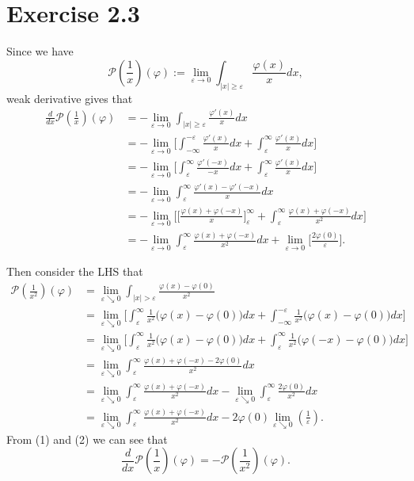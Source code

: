\documentclass[a4paper, 11pt]{article}
\begin{document}
\section{Exercise 2.3}
Since we have
$$
\mathcal{P}(\frac{1}{x})(\varphi):= \lim_{\varepsilon \to 0} \int_{\left|x\right|\geqslant \varepsilon} \frac{\varphi(x)}{x}dx
,
$$ 
weak derivative gives that
\begin{align*}
\frac{d}{dx}\mathcal{P}(\frac{1}{x})(\varphi)
& = - \lim_{\varepsilon \to 0} \int_{\left|x\right|\geqslant \varepsilon}\frac{\varphi' (x)}{x}dx\\
& =- \lim_{\varepsilon \to 0}\Big[\int_{-\infty}^{-\varepsilon}\frac{\varphi'(x)}{x}dx+\int_{\varepsilon}^{\infty}\frac{\varphi'(x)}{x}dx\Big]\\
& = - \lim_{\varepsilon \to 0}\Big[\int^{\infty}_{\varepsilon}\frac{\varphi'(-x)}{-x}dx+\int_{\varepsilon}^{\infty}\frac{\varphi'(x)}{x}dx\Big]\\
& = -\lim_{\varepsilon \to 0} \int_{\varepsilon}^{\infty}\frac{\varphi'(x)-\varphi'(-x)}{x}dx\\
&=-\lim_{\varepsilon \to 0}\Bigg[\Big[\frac{\varphi(x)+\varphi(-x)}{x}\Big]_{\varepsilon}^{\infty}+\int_{\varepsilon}^{\infty}\frac{\varphi(x)+\varphi(-x)}{x^{2}}dx\Bigg] \\
&= -\lim_{\varepsilon \to 0}\int_{\varepsilon}^{\infty}\frac{\varphi(x)+\varphi(-x)}{x^{2}}dx+\lim_{\varepsilon\to0}\Big[ \frac{2\varphi(0)}{\varepsilon}\Big].\tag{1}
\end{align*}


Then consider the LHS that
\begin{align*}
\mathcal{P}(\frac{1}{x^{2}})(\varphi)& =\lim_{\varepsilon \searrow 0} \int_{\left|x\right|>\varepsilon}\frac{\varphi(x)-\varphi(0)}{x^{2}}\\
&=\lim_{\varepsilon \searrow 0}\Bigg[\int_{\varepsilon}^{\infty}\frac{1}{x^{2}}\Big(\varphi(x)-\varphi(0)\Big)dx+\int_{-\infty}^{-\varepsilon}\frac{1}{x^{2}}\Big(\varphi(x)-\varphi(0)\Big)dx\Bigg]\\
& = \lim_{\varepsilon \searrow 0}\Bigg[\int_{\varepsilon}^{\infty}\frac{1}{x^{2}}\Big(\varphi(x)-\varphi(0)\Big)dx+\int_{\varepsilon}^{\infty}\frac{1}{x^{2}}\Big(\varphi(-x)-\varphi(0)\Big)dx\Bigg]\\
& = \lim_{\varepsilon \searrow 0}\int_{\varepsilon}^{\infty}\frac{\varphi(x)+\varphi(-x)-2\varphi(0)}{x^{2}}dx\\
&= \lim_{\varepsilon \searrow 0}\int_{\varepsilon}^{\infty}\frac{\varphi(x)+\varphi(-x)}{x^{2}}dx-\lim_{\varepsilon \searrow 0}\int_{\varepsilon}^{\infty}\frac{2\varphi(0)}{x^{2}}dx\\
& = \lim_{\varepsilon \searrow 0}\int_{\varepsilon}^{\infty}\frac{\varphi(x)+\varphi(-x)}{x^{2}}dx-2\varphi(0)\lim_{\varepsilon\searrow 0}(\frac{1}{\varepsilon}).\tag{2}
\end{align*}
From (1) and (2) we can see that
$$
    \frac{d}{dx}\mathcal{P}(\frac{1}{x})(\varphi)=-\mathcal{P}(\frac{1}{x^{2}})(\varphi).
$$
\end{document}
